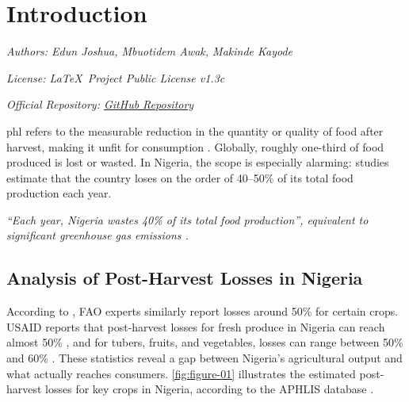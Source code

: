 \chapter[Introduction]{Introduction}
\label{cp:introduction}

{
\parindent0pt

\textit{Authors: Edun Joshua, Mbuotidem Awak, Makinde Kayode}


\textit{License: \LaTeX~Project Public License v1.3c}

\textit{Official Repository: \href{https://github.com/joseareia/ipleiria-thesis}{GitHub Repository}}

\vspace{.935em}

\acrfull{phl} refers to the measurable reduction in the quantity or quality of food after harvest, making it unfit for consumption
 \citep{FAO_PostHarvest}. Globally, roughly one-third of food produced is lost or wasted. In Nigeria, the scope is especially alarming: studies estimate that the country loses on the order of 40–50\% of its total food production each year.



\begin{block}[note]
    \textit{“Each year, Nigeria wastes 40\% of its total food production”, equivalent to significant greenhouse gas emissions
    \citep{worldbank2020}.}
    \end{block}
    


 \section{Analysis of Post-Harvest Losses in Nigeria}   

According to \citet{NAN2024}, FAO experts similarly report losses around 50\% for certain crops. 
USAID reports that post-harvest losses for fresh produce in Nigeria can reach almost 50\% \citet{Udi2024}, and for tubers, fruits, and vegetables, losses can range between 50\% and 60\% \citep{OkojieJaiyesimi2024}.
These statistics reveal a gap between Nigeria’s agricultural output and what actually reaches consumers. \autoref{fig:figure-01} illustrates the estimated post-harvest losses for key crops in Nigeria, according to the APHLIS database \citep{APHLIS}.


}
